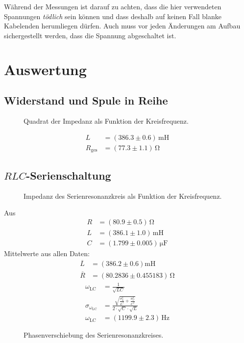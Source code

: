 \documentclass[12pt,a4paper,titlepage,headinclude,bibtotoc]{scrartcl}
\begin{document}
Während der Messungen ist darauf zu achten, dass die hier verwendeten Spannungen \emph{tödlich} sein können und dass deshalb auf keinen Fall blanke Kabelenden herumliegen dürfen.
Auch muss vor jeden Änderungen am Aufbau sichergestellt werden, dass die Spannung abgeschaltet ist.


\section{Auswertung}
\label{sec:auswertung}
\subsection{Widerstand und Spule in Reihe}
\begin{figure}[!htb]
	\centering
	
	\caption{Quadrat der Impedanz als Funktion der Kreisfrequenz.}
	\label{fig:messung1}
\end{figure}

\begin{align}
	L&=(386.3\pm 0.6)\,\si{\milli\henry}\\
	R_\text{ges}&=(77.3 \pm 1.1)\,\si{\ohm}
\end{align}
\subsection{$RLC$-Serienschaltung}
\begin{figure}[!htb]
	\centering
	
	\caption{Impedanz des Serienresonanzkreis als Funktion der Kreisfrequenz.}
	\label{fig:messung2}
\end{figure}
Aus
\begin{align}
	R &= (80.9 \pm 0.5)\,\si{\ohm}\\
	L &= (386.1 \pm 1.0)\,\si{\milli\henry}\\
	C &= (1.799 \pm 0.005)\,\si{\micro\farad}
\end{align}
Mittelwerte aus allen Daten:
\begin{align}
\overline L&=(386.2 \pm 0.6)\si{\milli\henry}\\
\overline R&=(80.2836 \pm 0.455183)\,\si{\ohm}
\end{align}
\begin{align}
\omega_\text{LC}&=\frac{1}{\sqrt{LC}}\\
\sigma_{\omega_\text{LC}}&=\frac{\sqrt{\frac{\sigma_{L}^{2}}{L^{2}} + \frac{\sigma_{C}^{2}}{C^{2}}}}{2 \cdot \sqrt{C} \cdot \sqrt{L}}\\
\omega_\text{LC}&=(1199.9 \pm 2.3)\,\si{\hertz}
\end{align}
\begin{figure}[!htb]
	\centering
	
	\caption{Phasenverschiebung des Serienresonanzkreises.}
	\label{fig:phase}
\end{figure}
\end{document}
